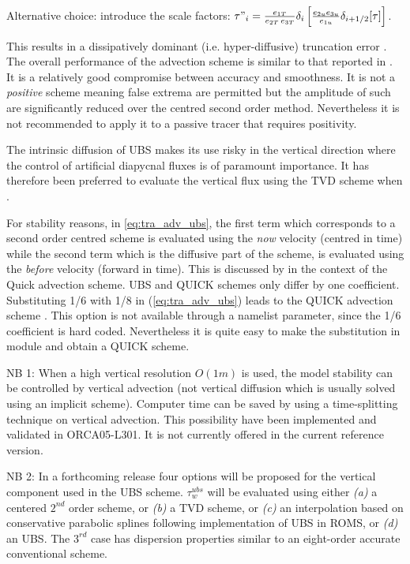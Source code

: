 \documentclass[../tex_main/NEMO_manual]{subfiles}
\begin{document}
Alternative choice: introduce the scale factors:  
$\tau "_i =\frac{e_{1T}}{e_{2T}\,e_{3T}}\delta _i \left[ \frac{e_{2u} e_{3u} }{e_{1u} }\delta _{i+1/2}[\tau] \right]$.


This results in a dissipatively dominant (i.e. hyper-diffusive) truncation error
\citep{Shchepetkin_McWilliams_OM05}.
The overall performance of the advection scheme is similar to that reported in \cite{Farrow1995}.
It is a relatively good compromise between accuracy and smoothness.
It is not a \emph{positive} scheme meaning false extrema are permitted but
the amplitude of such are significantly reduced over the centred second order method.
Nevertheless it is not recommended to apply it to a passive tracer that requires positivity. 

The intrinsic diffusion of UBS makes its use risky in the vertical direction where
the control of artificial diapycnal fluxes is of paramount importance.
It has therefore been preferred to evaluate the vertical flux using the TVD scheme when
.

For stability reasons, in \autoref{eq:tra_adv_ubs}, the first term which corresponds to
a second order centred scheme is evaluated using the \textit{now} velocity (centred in time) while
the second term which is the diffusive part of the scheme, is evaluated using the \textit{before} velocity
(forward in time).
This is discussed by \citet{Webb_al_JAOT98} in the context of the Quick advection scheme.
UBS and QUICK schemes only differ by one coefficient.
Substituting 1/6 with 1/8 in (\autoref{eq:tra_adv_ubs}) leads to the QUICK advection scheme \citep{Webb_al_JAOT98}.
This option is not available through a namelist parameter, since the 1/6 coefficient is hard coded.
Nevertheless it is quite easy to make the substitution in  module and obtain a QUICK scheme.

NB 1: When a high vertical resolution $O(1m)$ is used, the model stability can be controlled by vertical advection
(not vertical diffusion which is usually solved using an implicit scheme).
Computer time can be saved by using a time-splitting technique on vertical advection.
This possibility have been implemented and validated in ORCA05-L301.
It is not currently offered in the current reference version. 

NB 2: In a forthcoming release four options will be proposed for the vertical component used in the UBS scheme.
$\tau _w^{ubs}$ will be evaluated using either \textit{(a)} a centered $2^{nd}$ order scheme,
or \textit{(b)} a TVD scheme, or \textit{(c)} an interpolation based on conservative parabolic splines following
\citet{Shchepetkin_McWilliams_OM05} implementation of UBS in ROMS, or \textit{(d)} an UBS.
The $3^{rd}$ case has dispersion properties similar to an eight-order accurate conventional scheme.
\end{document}
